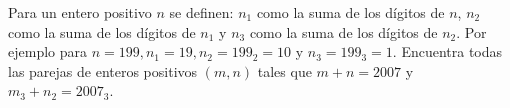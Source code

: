 Para un entero positivo $n$ se definen: $n_1$ como la suma de los dígitos de $n$, $n_2$ como la suma de los dígitos de $n_1$ y $n_3$ como la suma de los dígitos de $n_2$. Por ejemplo para $n=199,n_1=19,n_2=199_2=10$ y $n_3=199_3=1$. Encuentra todas las parejas de enteros positivos $(m,n)$ tales que $m+n=2007$ y $m_3+n_2=2007_3$.